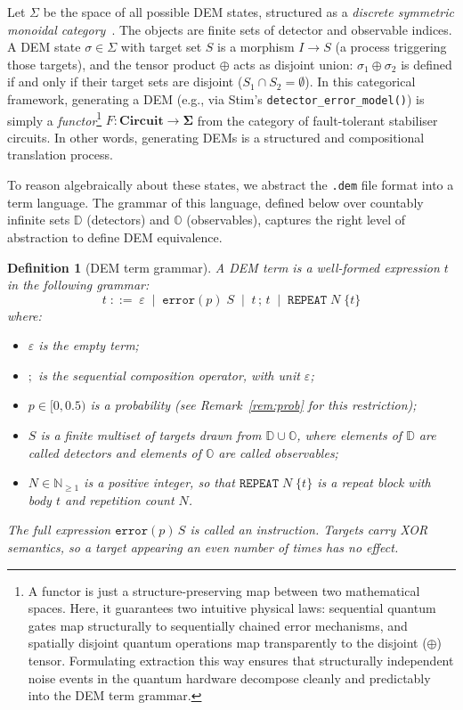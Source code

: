 \documentclass[11pt,a4paper]{article}
\newtheorem{definition}[theorem]{Definition}
\begin{document}
Let $\Sigma$ be the space of all possible DEM states, structured as a \emph{discrete symmetric monoidal category}~\cite{maclane1998categories}. The objects are finite sets of detector and observable indices. A DEM state $\sigma \in \Sigma$ with target set $S$ is a morphism $I \to S$ (a process triggering those targets), and the tensor product $\oplus$ acts as disjoint union: $\sigma_1 \oplus \sigma_2$ is defined if and only if their target sets are disjoint ($S_1 \cap S_2 = \emptyset$). In this categorical framework, generating a DEM (e.g., via Stim's \texttt{detector\_error\_model()}) is simply a \emph{functor}\footnote{A functor is just a structure-preserving map between two mathematical spaces. Here, it guarantees two intuitive physical laws: sequential quantum gates map structurally to sequentially chained error mechanisms, and spatially disjoint quantum operations map transparently to the disjoint ($\oplus$) tensor. Formulating extraction this way ensures that structurally independent noise events in the quantum hardware decompose cleanly and predictably into the DEM term grammar.} $F: \mathbf{Circuit} \to \mathbf{\Sigma}$ from the category of fault-tolerant stabiliser circuits. In other words, generating DEMs is a structured and compositional translation process.

To reason algebraically about these states, we abstract the \texttt{.dem} file format into a term language. The grammar of this language, defined below over countably infinite sets $\mathbb{D}$ (detectors) and $\mathbb{O}$ (observables), captures the right level of abstraction to define DEM equivalence.

\begin{definition}[DEM term grammar]
\label{def:grammar}
A \emph{DEM term} is a well-formed expression $t$ in the following grammar:
\[
  t \;::=\; \varepsilon \;\mid\; \mathtt{error}(p)\;S \;\mid\; t\,;\,t
    \;\mid\; \mathtt{REPEAT}\;N\;\{t\}
\]
where:
\begin{itemize}
  \item $\varepsilon$ is the \emph{empty term};
  \item $;$ is the \emph{sequential composition} operator, with unit $\varepsilon$;
  \item $p \in [0, 0.5)$ is a probability (see Remark~\ref{rem:prob} for this restriction);
  \item $S$ is a finite multiset of \emph{targets} drawn from $\mathbb{D} \cup \mathbb{O}$,
    where elements of $\mathbb{D}$ are called \emph{detectors} and elements of $\mathbb{O}$
    are called \emph{observables};
  \item $N \in \mathbb{N}_{\geq 1}$ is a positive integer, so that $\mathtt{REPEAT}\;N\;\{t\}$ is a \emph{repeat block} with body $t$ and repetition count $N$.
\end{itemize}

The full expression $\mathtt{error}(p)\,S$ is called an \emph{instruction}. Targets carry XOR semantics, so a target appearing an even number of times has no effect. 
\end{definition}
\end{document}
